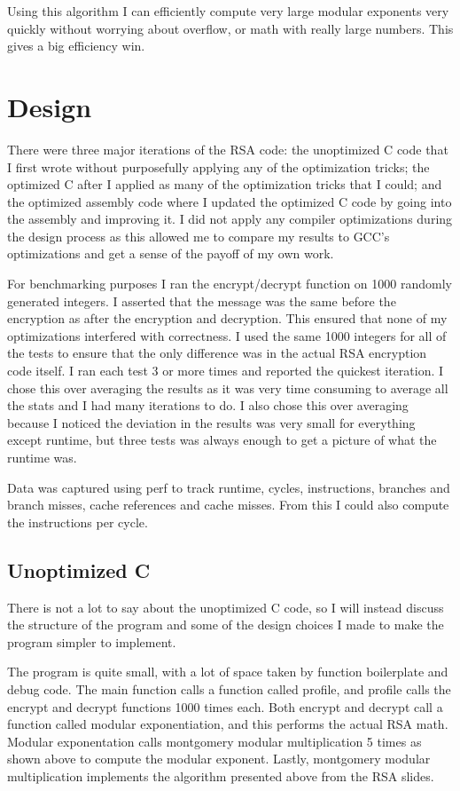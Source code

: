 \documentclass[12pt]{article}
\begin{document}
Using this algorithm I can efficiently compute very large modular exponents very quickly without worrying about overflow, or math with really large numbers. This gives a big efficiency win.

\section{Design}

There were three major iterations of the RSA code: the unoptimized C code that I first wrote without purposefully applying any of the optimization tricks; the optimized C after I applied as many of the optimization tricks that I could; and the optimized assembly code where I updated the optimized C code by going into the assembly and improving it. I did not apply any compiler optimizations during the design process as this allowed me to compare my results to GCC's optimizations and get a sense of the payoff of my own work.

For benchmarking purposes I ran the encrypt/decrypt function on 1000 randomly generated integers. I asserted that the message was the same before the encryption as after the encryption and decryption. This ensured that none of my optimizations interfered with correctness. 
I used the same 1000 integers for all of the tests to ensure that the only difference was in the actual RSA encryption code itself. I ran each test 3 or more times and reported the quickest iteration. I chose this over averaging the results as it was very time consuming to average all the stats and I had many iterations to do. I also chose this over averaging because I noticed the deviation in the results was very small for everything except runtime, but three tests was always enough to get a picture of what the runtime was.  

Data was captured using perf to track runtime, cycles, instructions, branches and branch misses, cache references and cache misses. From this I could also compute the instructions per cycle. 

\subsection{Unoptimized C}

There is not a lot to say about the unoptimized C code, so I will instead discuss the structure of the program and some of the design choices I made to make the program simpler to implement.

The program is quite small, with a lot of space taken by function boilerplate and debug code. The main function calls a function called profile, and profile calls the encrypt and decrypt functions 1000 times each. Both encrypt and decrypt call a function called modular exponentiation, and this performs the actual RSA math. Modular exponentation calls montgomery modular multiplication 5 times as shown above to compute the modular exponent. Lastly, montgomery modular multiplication implements the algorithm presented above from the RSA slides. 
\end{document}
